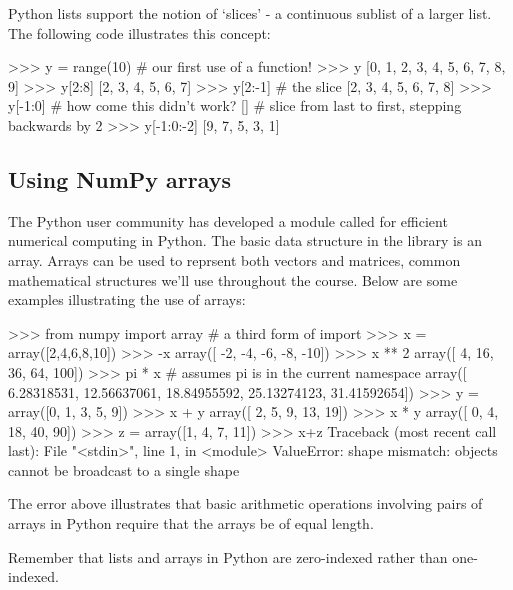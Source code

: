 Python lists support the notion of `slices' - a continuous sublist of a
larger list. The following code illustrates this concept:
%
\begin{python}
>>> y = range(10)  # our first use of a function!
>>> y
[0, 1, 2, 3, 4, 5, 6, 7, 8, 9]
>>> y[2:8]
[2, 3, 4, 5, 6, 7]
>>> y[2:-1] # the slice
[2, 3, 4, 5, 6, 7, 8]
>>> y[-1:0] # how come this didn't work? 
[]
# slice from last to first, stepping backwards by 2
>>> y[-1:0:-2]  
[9, 7, 5, 3, 1]
\end{python}

\subsection{Using NumPy arrays}

The Python user community has developed a module called \numpy for efficient numerical computing in Python.  The basic data structure in the \numpy library is an array. Arrays can be used to reprsent both vectors and matrices, common mathematical structures we'll use throughout the course. Below are some examples illustrating the use of \numpy arrays:
\begin{python}
>>> from numpy import array # a third form of import 
>>> x = array([2,4,6,8,10])
>>> -x
array([ -2,  -4,  -6,  -8, -10])
>>> x ** 2
array([  4,  16,  36,  64, 100])
>>> pi * x # assumes pi is in the current namespace
array([  6.28318531,  12.56637061,  18.84955592,  25.13274123,  31.41592654])
>>> y = array([0, 1, 3, 5, 9])
>>> x + y
array([ 2,  5,  9, 13, 19])
>>> x * y
array([ 0,  4, 18, 40, 90])
>>> z = array([1, 4, 7, 11])
>>> x+z
Traceback (most recent call last):
  File "<stdin>", line 1, in <module>
ValueError: shape mismatch: objects cannot be broadcast to a single shape
\end{python}
%
The error above illustrates that basic arithmetic operations involving pairs of \numpy arrays in Python require that the arrays be of equal length.

Remember that lists and arrays in Python are zero-indexed rather than
one-indexed.
%

